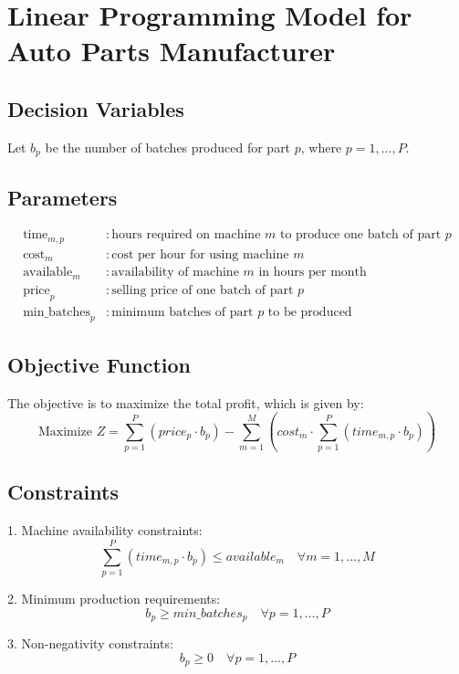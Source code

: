 \documentclass{article}
\begin{document}
\section*{Linear Programming Model for Auto Parts Manufacturer}

\subsection*{Decision Variables}
Let \( b_p \) be the number of batches produced for part \( p \), where \( p = 1, \ldots, P \).

\subsection*{Parameters}
\begin{align*}
\text{time}_{m,p} & : \text{hours required on machine } m \text{ to produce one batch of part } p \\
\text{cost}_m & : \text{cost per hour for using machine } m \\
\text{available}_m & : \text{availability of machine } m \text{ in hours per month} \\
\text{price}_p & : \text{selling price of one batch of part } p \\
\text{min\_batches}_p & : \text{minimum batches of part } p \text{ to be produced}
\end{align*}

\subsection*{Objective Function}
The objective is to maximize the total profit, which is given by:
\[
\text{Maximize } Z = \sum_{p=1}^{P} (price_p \cdot b_p) - \sum_{m=1}^{M} (cost_m \cdot \sum_{p=1}^{P} (time_{m,p} \cdot b_p))
\]

\subsection*{Constraints}
1. Machine availability constraints:
\[
\sum_{p=1}^{P} (time_{m,p} \cdot b_p) \leq available_m \quad \forall m = 1, \ldots, M
\]

2. Minimum production requirements:
\[
b_p \geq min\_batches_p \quad \forall p = 1, \ldots, P
\]

3. Non-negativity constraints:
\[
b_p \geq 0 \quad \forall p = 1, \ldots, P
\]
\end{document}

